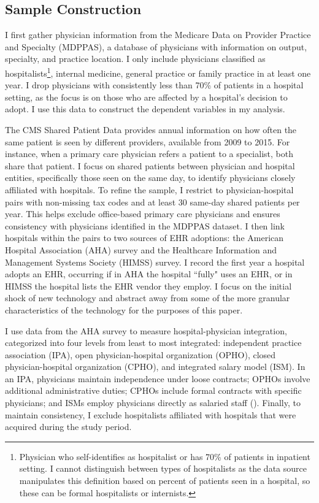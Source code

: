 \documentclass[12pt]{article}
\begin{document}
\subsection{Sample Construction}

I first gather physician information from the Medicare Data on Provider Practice and Specialty (MDPPAS), a database of physicians with information on output, specialty, and practice location. I only include physicians classified as hospitalists\footnote{Physician who self-identifies as hospitalist or has 70\% of patients in inpatient setting. I cannot distinguish between types of hospitalists as the data source manipulates this definition based on percent of patients seen in a hospital, so these can be formal hospitalists or internists.}, internal medicine, general practice or family practice in at least one year. I drop physicians with consistently less than 70\% of patients in a hospital setting, as the focus is on those who are affected by a hospital's decision to adopt. I use this data to construct the dependent variables in my analysis.  

The CMS Shared Patient Data provides annual information on how often the same patient is seen by different providers, available from 2009 to 2015. For instance, when a primary care physician refers a patient to a specialist, both share that patient. I focus on shared patients between physician and hospital entities, specifically those seen on the same day, to identify physicians closely affiliated with hospitals. To refine the sample, I restrict to physician-hospital pairs with non-missing tax codes and at least 30 same-day shared patients per year. This helps exclude office-based primary care physicians and ensures consistency with physicians identified in the MDPPAS dataset. I then link hospitals within the pairs to two sources of EHR adoptions: the American Hospital Association (AHA) survey and the Healthcare Information and Management Systems Society (HIMSS) survey. I record the first year a hospital adopts an EHR, occurring if in AHA the hospital ``fully" uses an EHR, or in HIMSS the hospital lists the EHR vendor they employ. I focus on the initial shock of new technology and abstract away from some of the more granular characteristics of the technology for the purposes of this paper.

I use data from the AHA survey to measure hospital-physician integration, categorized into four levels from least to most integrated: independent practice association (IPA), open physician-hospital organization (OPHO), closed physician-hospital organization (CPHO), and integrated salary model (ISM). In an IPA, physicians maintain independence under loose contracts; OPHOs involve additional administrative duties; CPHOs include formal contracts with specific physicians; and ISMs employ physicians directly as salaried staff (\cite{short2017integration}). Finally, to maintain consistency, I exclude hospitalists affiliated with hospitals that were acquired during the study period.
\end{document}
